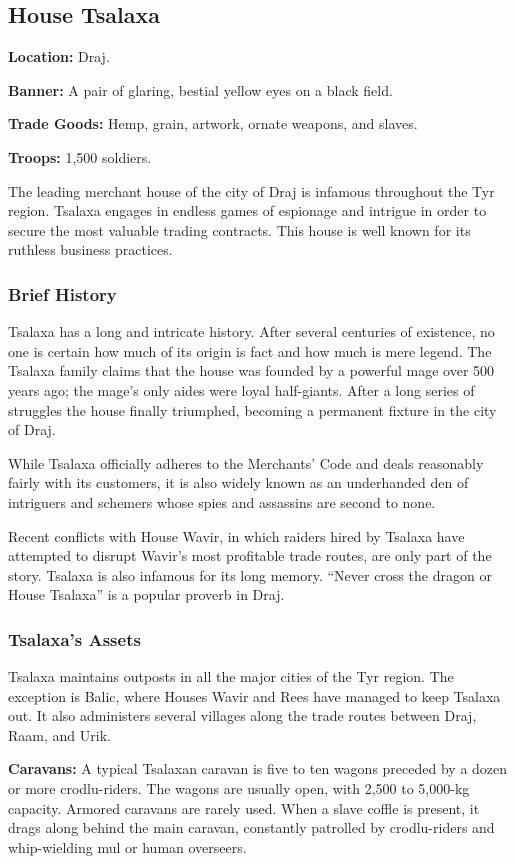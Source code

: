\subsection{House Tsalaxa}
\textbf{Location:} Draj.

\textbf{Banner:} A pair of glaring, bestial yellow eyes on a black field.

\textbf{Trade Goods:} Hemp, grain, artwork, ornate weapons, and slaves.

\textbf{Troops:} 1,500 soldiers.

The leading merchant house of the city of Draj is infamous throughout the Tyr region. Tsalaxa engages in endless games of espionage and intrigue in order to secure the most valuable trading contracts. This house is well known for its ruthless business practices.

\subsubsection{Brief History}
Tsalaxa has a long and intricate history. After several centuries of existence, no one is certain how much of its origin is fact and how much is mere legend. The Tsalaxa family claims that the house was founded by a powerful mage over 500 years ago; the mage's only aides were loyal half-giants. After a long series of struggles the house finally triumphed, becoming a permanent fixture in the city of Draj.

While Tsalaxa officially adheres to the Merchants' Code and deals reasonably fairly with its customers, it is also widely known as an underhanded den of intriguers and schemers whose spies and assassins are second to none.

Recent conflicts with House Wavir, in which raiders hired by Tsalaxa have attempted to disrupt Wavir's most profitable trade routes, are only part of the story. Tsalaxa is also infamous for its long memory. ``Never cross the dragon or House Tsalaxa'' is a popular proverb in Draj.

\subsubsection{Tsalaxa's Assets}
Tsalaxa maintains outposts in all the major cities of the Tyr region. The exception is Balic, where Houses Wavir and Rees have managed to keep Tsalaxa out. It also administers several villages along the trade routes between Draj, Raam, and Urik.

\textbf{Caravans:} A typical Tsalaxan caravan is five to ten wagons preceded by a dozen or more crodlu-riders. The wagons are usually open, with 2,500 to 5,000-kg capacity. Armored caravans are rarely used. When a slave coffle is present, it drags along behind the main caravan, constantly patrolled by crodlu-riders and whip-wielding mul or human overseers.


